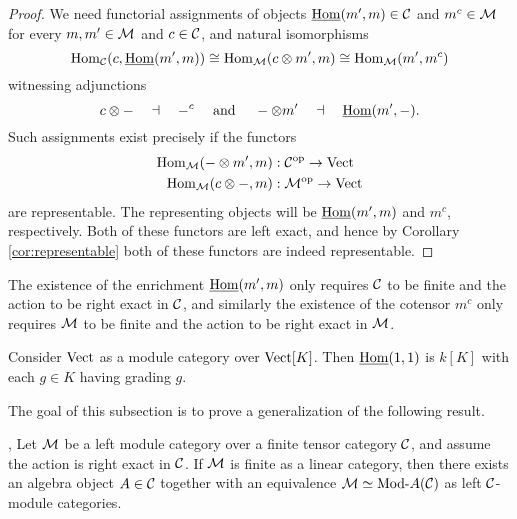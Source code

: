\documentclass{amsart}
\begin{document}
\begin{proof}
	We need functorial assignments of objects $\operatorname{\underline{Hom}}(m', m) \in \mathcal C$ and $m^c \in \mathcal M$ for every $m,m' \in \mathcal M$ and $c \in \mathcal C$, and natural isomorphisms
	\begin{equation*}
		\operatorname{Hom}_\mathcal C(c, \operatorname{\underline{Hom}}(m', m)) \cong \operatorname{Hom}_\mathcal M(c \otimes m', m) \cong \operatorname{Hom}_\mathcal M( m', m^c)
	\end{equation*}
	witnessing adjunctions
	\begin{equation*}
			c \otimes - \quad \dashv\quad -^c \quad \textrm{ and } \quad - \otimes m' \quad \dashv \quad \operatorname{\underline{Hom}}(m', -).
	\end{equation*}
Such assignments exist precisely if the functors
\begin{align*}
	\operatorname{Hom}_\mathcal M(-\otimes m', m): \; & \mathcal C^{\mathrm{op}} \to \mathrm{Vect} \\
	\operatorname{Hom}_\mathcal M(c \otimes -, m): \; & \mathcal M^{\mathrm{op}} \to \mathrm{Vect}
\end{align*}
are representable. The representing objects will be $\operatorname{\underline{Hom}}(m', m)$ and $m^c$, respectively. Both of these functors are left exact, and hence by Corollary \ref{cor:representable} both of these functors are indeed representable.  %
\end{proof}

\begin{remark} \label{rem-enrich}
	The existence of the enrichment $\operatorname{\underline{Hom}}(m', m)$ only requires $\mathcal C$ to be finite and the action to be right exact in $\mathcal C$, and similarly the existence of the cotensor $m^c$ only requires $\mathcal M$ to be finite and the action to be right exact in $\mathcal M$.
\end{remark}

\begin{example}
Consider $\mathrm{Vect}$ as a module category over $\mathrm{Vect}[K]$.  Then $\operatorname{\underline{Hom}}(1,1)$ is $k[K]$ with each $g \in K$ having grading $g$.
\end{example}



The goal of this subsection is to prove a generalization of the following result.

\begin{theorem}{\cite[Thm 2.11.6]{EGNO}, \cite[Thm 1]{MR1976459}} \label{thm:EGNO2.11.6}
	Let $\mathcal M$ be a left module category over a finite tensor category $\mathcal C$, and assume the action is right exact in $\mathcal C$. If $\mathcal M$ is finite as a linear category, then there exists an algebra object $A \in \mathcal C$ together with an equivalence $\cM \simeq \Mod{}{A} (\cC)$ as left $\mathcal C$-module categories. 
\end{theorem}
\end{document}
